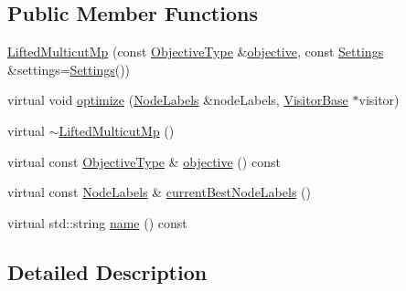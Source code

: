 \subsection*{Public Member Functions}
\begin{DoxyCompactItemize}
\item 
\hyperlink{classnifty_1_1graph_1_1lifted__multicut_1_1LiftedMulticutMp_a70e3a9362dd9c4abc2058467b10468da}{Lifted\+Multicut\+Mp} (const \hyperlink{classnifty_1_1graph_1_1lifted__multicut_1_1LiftedMulticutMp_acce0234d990c40af0002f39dd7e309b7}{Objective\+Type} \&\hyperlink{classnifty_1_1graph_1_1lifted__multicut_1_1LiftedMulticutMp_a8caa8ecb085520cab62a7b2a43edf2d2}{objective}, const \hyperlink{structnifty_1_1graph_1_1lifted__multicut_1_1LiftedMulticutMp_1_1Settings}{Settings} \&settings=\hyperlink{structnifty_1_1graph_1_1lifted__multicut_1_1LiftedMulticutMp_1_1Settings}{Settings}())
\item 
virtual void \hyperlink{classnifty_1_1graph_1_1lifted__multicut_1_1LiftedMulticutMp_a25228d3aae9ba9d0fc5630b83bf4f8e4}{optimize} (\hyperlink{classnifty_1_1graph_1_1lifted__multicut_1_1LiftedMulticutMp_a161412253a683e250bb4c164d40a0d9e}{Node\+Labels} \&node\+Labels, \hyperlink{classnifty_1_1graph_1_1lifted__multicut_1_1LiftedMulticutMp_aafe286a57ff4bda8e0c50a00a98c3b32}{Visitor\+Base} $\ast$visitor)
\item 
virtual \hyperlink{classnifty_1_1graph_1_1lifted__multicut_1_1LiftedMulticutMp_a0256928abff187892aa6c0fb04b8328e}{$\sim$\+Lifted\+Multicut\+Mp} ()
\item 
virtual const \hyperlink{classnifty_1_1graph_1_1lifted__multicut_1_1LiftedMulticutMp_acce0234d990c40af0002f39dd7e309b7}{Objective\+Type} \& \hyperlink{classnifty_1_1graph_1_1lifted__multicut_1_1LiftedMulticutMp_a8caa8ecb085520cab62a7b2a43edf2d2}{objective} () const 
\item 
virtual const \hyperlink{classnifty_1_1graph_1_1lifted__multicut_1_1LiftedMulticutMp_a161412253a683e250bb4c164d40a0d9e}{Node\+Labels} \& \hyperlink{classnifty_1_1graph_1_1lifted__multicut_1_1LiftedMulticutMp_a3a0f3c251180a16654b02471d4acff9b}{current\+Best\+Node\+Labels} ()
\item 
virtual std\+::string \hyperlink{classnifty_1_1graph_1_1lifted__multicut_1_1LiftedMulticutMp_a3d4cd89f1f2064c0433b31d018e0d2b7}{name} () const 
\end{DoxyCompactItemize}


\subsection{Detailed Description}
